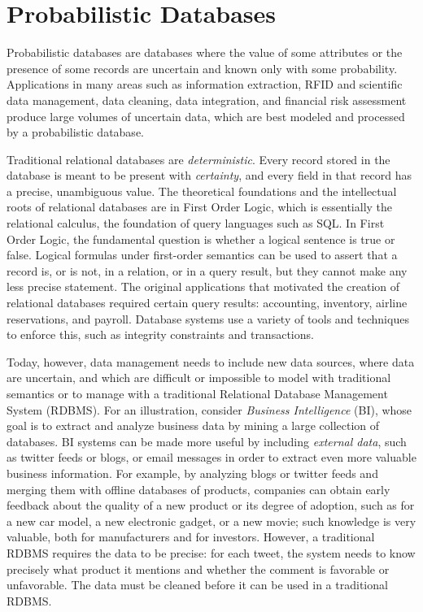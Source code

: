 
\section{Probabilistic Databases}
Probabilistic databases are databases where the value of some attributes or the presence of some records are uncertain and known only with some probability. 
Applications in many areas such as information extraction, RFID and scientific data management, data cleaning, data integration, and financial risk assessment produce large volumes of uncertain data, which are best modeled and processed by a probabilistic database.

Traditional relational databases are \textit{deterministic}. 
Every record stored in the database is meant to be present with \textit{certainty}, and every field in that record has a precise, unambiguous value. 
The theoretical foundations and the intellectual roots of relational databases are in First Order Logic, which is essentially the relational calculus, the foundation of query languages such as SQL. 
In First Order Logic, the fundamental question is whether a logical sentence is true or false. 
Logical formulas under first-order semantics can be used to assert that a record is, or is not, in a relation, or in a query result, but they cannot make any less precise statement. The original applications that motivated the creation of relational databases required certain query results: accounting, inventory, airline reservations, and payroll. 
Database systems use a variety of tools and techniques to enforce this, such as integrity constraints and transactions.

Today, however, data management needs to include new data sources, where data are uncertain, and which are difficult or impossible to model with traditional semantics or to manage with a traditional Relational Database Management System (RDBMS). 
For an illustration, consider \textit{Business Intelligence} (BI), whose goal is to extract and analyze business data by mining a large collection of databases. 
BI systems can be made more useful by including \textit{external data}, such as twitter feeds or blogs, or email messages in order to extract even more valuable business information. 
For example, by analyzing blogs or twitter feeds and merging them with offline databases of products, companies can obtain early feedback about the quality of a new product or its degree of adoption, such as for a new car model, a new electronic gadget, or a new movie; such knowledge is very valuable, both for manufacturers and for investors. However, a traditional RDBMS requires the data to be precise: for each tweet, the system needs to know precisely what product it mentions and whether the comment is favorable or unfavorable. The data must be cleaned before it can be used in a traditional RDBMS.

